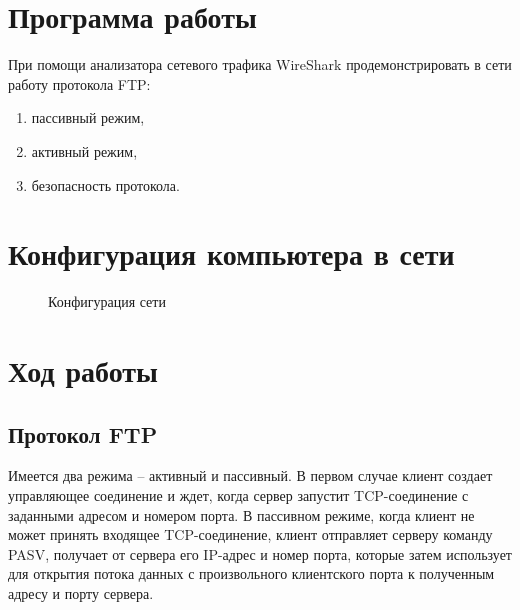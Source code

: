 \documentclass[a4paper, 14pt,russian]{article}
\begin{document}
\section{Программа работы}
При помощи анализатора сетевого трафика WireShark продемонстрировать в сети работу протокола
FTP:
\begin{enumerate}
	\item пассивный режим,
	\item активный режим,
	\item безопасность протокола.
\end{enumerate}

\section{Конфигурация компьютера в сети}
\begin{figure}[h]
	\caption{Конфигурация сети}
	\label{img:system}
\end{figure}

\section{Ход работы}

\subsection{Протокол FTP}
	Имеется два режима – активный и пассивный. В первом случае клиент создает управляющее соединение и ждет, когда сервер запустит TCP-соединение с заданными адресом и номером порта. В пассивном режиме, когда клиент не может принять входящее TCP-соединение, клиент отправляет серверу команду PASV, получает от сервера его IP-адрес и номер порта, которые затем использует для открытия потока данных с произвольного клиентского порта к полученным адресу и порту сервера.
	
\end{document}
